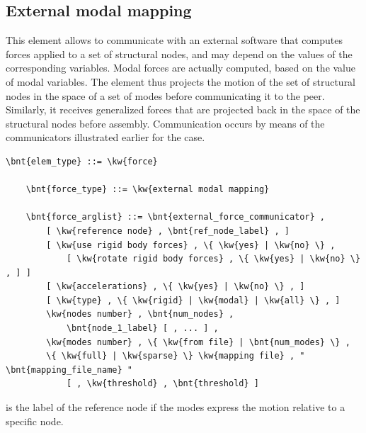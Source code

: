 \subsection{External modal mapping}
\label{sec:EL:FORCE:EXTERNAL:MODAL_MAPPING}
This element allows to communicate with an external software that computes
forces applied to a set of structural nodes,
and may depend on the values of the corresponding variables.
Modal forces are actually computed, based on the value of modal variables.
The element thus projects the motion of the set of structural nodes
in the space of a set of modes before communicating it to the peer.
Similarly, it receives generalized forces that are projected back
in the space of the structural nodes before assembly.
Communication occurs by means of the communicators illustrated earlier
for the  case.
\begin{Verbatim}[commandchars=\\\{\}]
    \bnt{elem_type} ::= \kw{force}

    \bnt{force_type} ::= \kw{external modal mapping}

    \bnt{force_arglist} ::= \bnt{external_force_communicator} ,
        [ \kw{reference node} , \bnt{ref_node_label} , ]
        [ \kw{use rigid body forces} , \{ \kw{yes} | \kw{no} \} ,
            [ \kw{rotate rigid body forces} , \{ \kw{yes} | \kw{no} \} , ] ]
        [ \kw{accelerations} , \{ \kw{yes} | \kw{no} \} , ]
        [ \kw{type} , \{ \kw{rigid} | \kw{modal} | \kw{all} \} , ]
        \kw{nodes number} , \bnt{num_nodes} ,
            \bnt{node_1_label} [ , ... ] ,
        \kw{modes number} , \{ \kw{from file} | \bnt{num_modes} \} ,
        \{ \kw{full} | \kw{sparse} \} \kw{mapping file} , " \bnt{mapping_file_name} "
            [ , \kw{threshold} , \bnt{threshold} ]
\end{Verbatim}
 is the label of the reference node
if the modes express the motion relative to a specific node.

